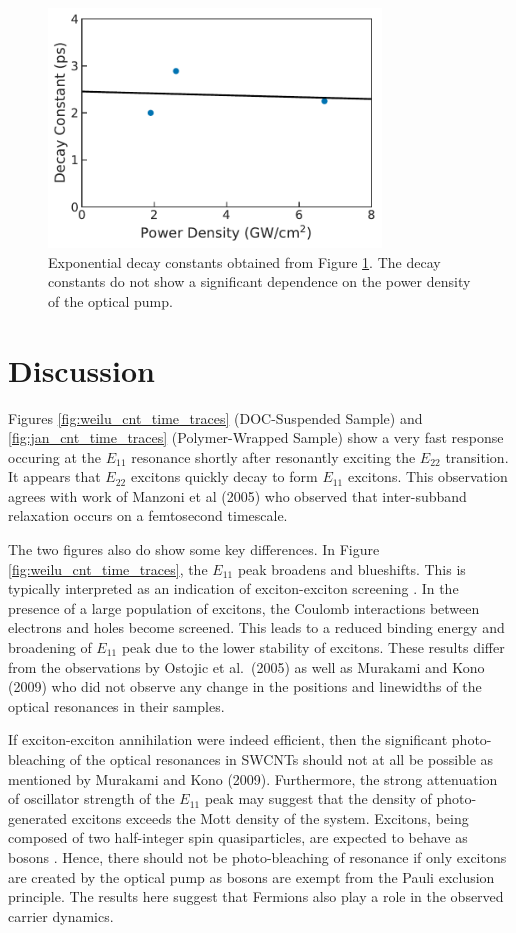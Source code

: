 \clearpage

\begin{figure}[ht]
	\centering
	\includegraphics[height=2.5in]{images/chapter_my_data/Jan_CNT_decay_const_fit}
	\caption{Exponential decay constants obtained from Figure \ref{fig:jan_cnt_decay_const}. The decay constants do not show a significant dependence on the power density of the optical pump. }
	\label{fig:jan_cnt_decay_const}
\end{figure}

\section{Discussion}

Figures \ref{fig:weilu_cnt_time_traces} (DOC-Suspended Sample) and \ref{fig:jan_cnt_time_traces} (Polymer-Wrapped Sample) show a very fast response occuring at the $E_{11}$ resonance shortly after resonantly exciting the $E_{22}$ transition. It appears that $E_{22}$ excitons quickly decay to form $E_{11}$ excitons. This observation agrees with work of Manzoni et al (2005) who observed that inter-subband relaxation occurs on a femtosecond timescale.

The two figures also do show some key differences. In Figure \ref{fig:weilu_cnt_time_traces}, the $E_{11}$ peak broadens and blueshifts. This is typically interpreted as an indication of exciton-exciton screening \cite{shah1996ultrafast}. In the presence of a large population of excitons, the Coulomb interactions between electrons and holes become screened. This leads to a reduced binding energy and broadening of $E_{11}$ peak due to the lower stability of excitons. These results differ from the observations by Ostojic et al.\ (2005) as well as Murakami and Kono (2009) who did not observe any change in the positions and linewidths of the optical resonances in their samples.

If exciton-exciton annihilation were indeed efficient, then the significant photo-bleaching of the optical resonances in SWCNTs should not at all be possible as mentioned by Murakami and Kono (2009). Furthermore, the strong attenuation of oscillator strength of the $E_{11}$ peak may suggest that the density of photo-generated excitons exceeds the Mott density of the system. Excitons, being composed of two half-integer spin quasiparticles, are expected to behave as bosons \cite{Ashcroft, laikhtman2007excitons}. Hence, there should not be photo-bleaching of resonance if only excitons are created by the optical pump as bosons are exempt from the Pauli exclusion principle. The results here suggest that Fermions also play a role in the observed carrier dynamics.

